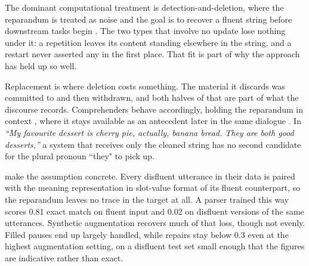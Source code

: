 \documentclass{article}
\begin{document}
The dominant computational treatment is detection-and-deletion, where the
reparandum is treated as noise and the goal is to recover a fluent string before
downstream tasks begin \citep{johnsonTAGbasedNoisychannelModel2004,
zayatsRobustCrossdomainDisfluency2018, rohanianBestBothWorlds2021}. The two
types that involve no update lose nothing under it: a repetition leaves its
content standing elsewhere in the string, and a restart never asserted any in the
first place. That fit is part of why the approach has held up so well.

Replacement is where deletion costs something. The material it discards was
committed to and then withdrawn, and both halves of that are part of what the
discourse records. Comprehenders behave accordingly, holding the reparandum in
context \citep{brennanHowListenersCompensate2001}, where it stays available as an
antecedent later in the same dialogue
\citep{purverComputationalModelsMiscommunication2018}.
In \textit{``My favourite dessert is cherry pie, actually, banana bread. They are
both good desserts,''} a system that receives only the cleaned string has no
second candidate for the plural pronoun ``they" to pick up.

\citet{senSemanticParsingDisfluent2021} make the assumption concrete. Every
disfluent utterance in their data is paired with the meaning representation in slot-value format of
its fluent counterpart, so the reparandum leaves no trace in the target at all.
A parser trained this way scores 0.81 exact match on fluent input and 0.02 on
disfluent versions of the same utterances. Synthetic augmentation recovers much
of that loss, though not evenly. Filled pauses end up largely handled, while
repairs stay below 0.3 even at the highest augmentation setting, on a disfluent
test set small enough that the figures are indicative rather than exact.
\end{document}
